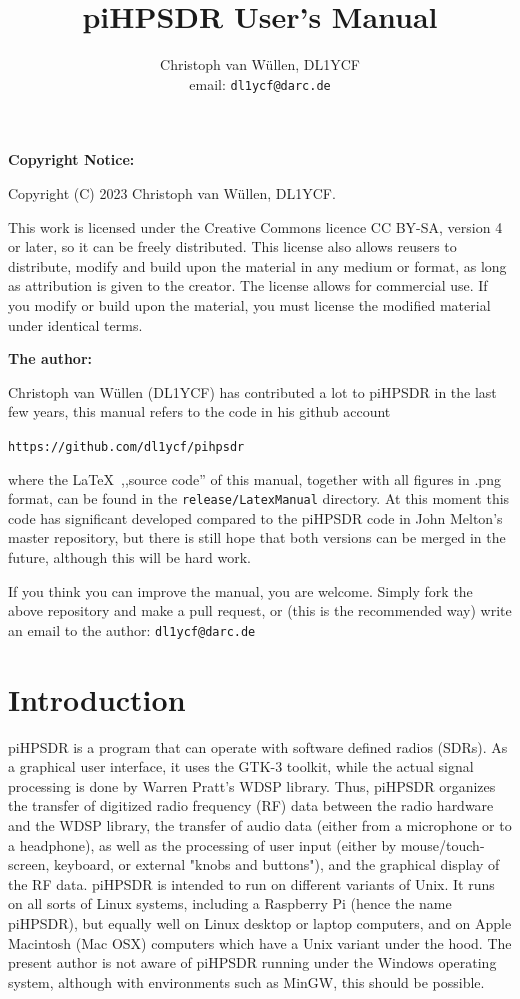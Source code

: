 \documentclass[12pt]{book}
\begin{document}
\frontmatter
\title{
piHPSDR User's Manual
}
\author{
Christoph van W\"ullen, DL1YCF \\
email: \texttt{dl1ycf@darc.de}
}

%
\maketitle
\textbf{Copyright Notice:}

Copyright (C) 2023 Christoph van W\"ullen, DL1YCF.

This work is licensed under
the Creative Commons licence CC BY-SA, version 4 or later, so it can be freely distributed.
 This license also allows reusers to distribute, modify and build upon the material in any medium or format,
as long as attribution is given to the creator. The license allows for commercial use.
If you modify or build upon the material, you must license the modified material under identical terms.

\bigskip
\textbf{The author:}

Christoph van W\"ullen (DL1YCF) has contributed a lot to piHPSDR in the last few years, this manual refers
to the code in his github account

\texttt{https://github.com/dl1ycf/pihpsdr}

where the \LaTeX\   ,,source code'' of this manual, together with all figures in .png format, can be found
in the \texttt{release/LatexManual} directory. At this moment this code has significant developed compared
to the piHPSDR code in John Melton's master repository, but there is still hope that both versions can
be merged in  the  future, although this  will  be hard  work.

If you think you can improve the manual, you are welcome.
Simply fork the above repository and make a pull request, or (this is the recommended way) write an
email to the author: \texttt{dl1ycf@darc.de}

\tableofcontents
\mainmatter
\chapter{Introduction}
piHPSDR is a program that can operate with software defined radios (SDRs). As a graphical user interface,
it uses the GTK-3 toolkit, while the actual signal processing is done by Warren Pratt's WDSP library. Thus,
piHPSDR organizes the transfer of digitized radio frequency (RF) data between the radio hardware and the WDSP library, the
transfer of audio data (either from a microphone or to a headphone), as well as the processing of user
input (either by mouse/touch-screen, keyboard, or external "knobs and buttons"),
 and the graphical display of the RF data. piHPSDR is intended
to run on different variants of Unix. It runs on all sorts of Linux systems, including a Raspberry Pi (hence
the name piHPSDR), but equally well on Linux desktop or laptop computers, and on Apple Macintosh (Mac OSX)
computers which have a Unix variant under the hood. The present author is not aware of piHPSDR running
under the Windows operating system, although with environments such as MinGW, this should be possible.
\end{document}
